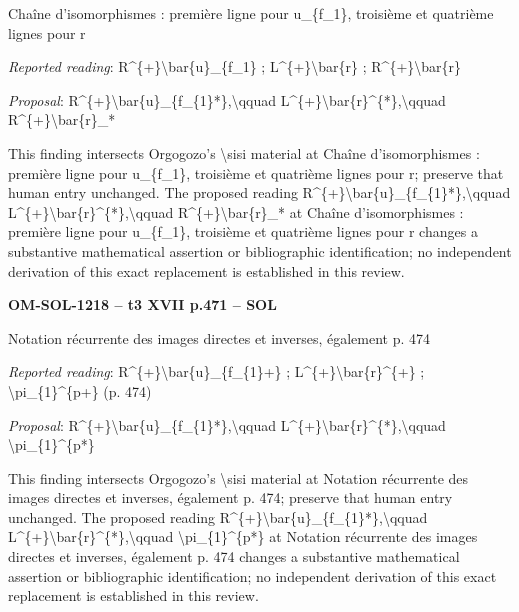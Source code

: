 Chaîne d'isomorphismes : première ligne pour u\_\{f\_1\}, troisième et quatrième lignes pour r\par
\emph{Reported reading}: R\textasciicircum{}\{+\}\textbackslash{}bar\{u\}\_\{f\_1\} ; L\textasciicircum{}\{+\}\textbackslash{}bar\{r\} ; R\textasciicircum{}\{+\}\textbackslash{}bar\{r\}\par
\emph{Proposal}: R\textasciicircum{}\{+\}\textbackslash{}bar\{u\}\_\{f\_\{1\}*\},\textbackslash{}qquad L\textasciicircum{}\{+\}\textbackslash{}bar\{r\}\textasciicircum{}\{*\},\textbackslash{}qquad R\textasciicircum{}\{+\}\textbackslash{}bar\{r\}\_*\par
This finding intersects Orgogozo's \textbackslash{}sisi material at Chaîne d'isomorphismes : première ligne pour u\_\{f\_1\}, troisième et quatrième lignes pour r; preserve that human entry unchanged. The proposed reading R\textasciicircum{}\{+\}\textbackslash{}bar\{u\}\_\{f\_\{1\}*\},\textbackslash{}qquad L\textasciicircum{}\{+\}\textbackslash{}bar\{r\}\textasciicircum{}\{*\},\textbackslash{}qquad R\textasciicircum{}\{+\}\textbackslash{}bar\{r\}\_* at Chaîne d'isomorphismes : première ligne pour u\_\{f\_1\}, troisième et quatrième lignes pour r changes a substantive mathematical assertion or bibliographic identification; no independent derivation of this exact replacement is established in this review.\par
\par\noindent\textbf{OM-SOL-1218 -- t3 XVII p.471 -- SOL}\par
Notation récurrente des images directes et inverses, également p. 474\par
\emph{Reported reading}: R\textasciicircum{}\{+\}\textbackslash{}bar\{u\}\_\{f\_\{1\}+\} ; L\textasciicircum{}\{+\}\textbackslash{}bar\{r\}\textasciicircum{}\{+\} ; \textbackslash{}pi\_\{1\}\textasciicircum{}\{p+\} (p. 474)\par
\emph{Proposal}: R\textasciicircum{}\{+\}\textbackslash{}bar\{u\}\_\{f\_\{1\}*\},\textbackslash{}qquad L\textasciicircum{}\{+\}\textbackslash{}bar\{r\}\textasciicircum{}\{*\},\textbackslash{}qquad \textbackslash{}pi\_\{1\}\textasciicircum{}\{p*\}\par
This finding intersects Orgogozo's \textbackslash{}sisi material at Notation récurrente des images directes et inverses, également p. 474; preserve that human entry unchanged. The proposed reading R\textasciicircum{}\{+\}\textbackslash{}bar\{u\}\_\{f\_\{1\}*\},\textbackslash{}qquad L\textasciicircum{}\{+\}\textbackslash{}bar\{r\}\textasciicircum{}\{*\},\textbackslash{}qquad \textbackslash{}pi\_\{1\}\textasciicircum{}\{p*\} at Notation récurrente des images directes et inverses, également p. 474 changes a substantive mathematical assertion or bibliographic identification; no independent derivation of this exact replacement is established in this review.\par
